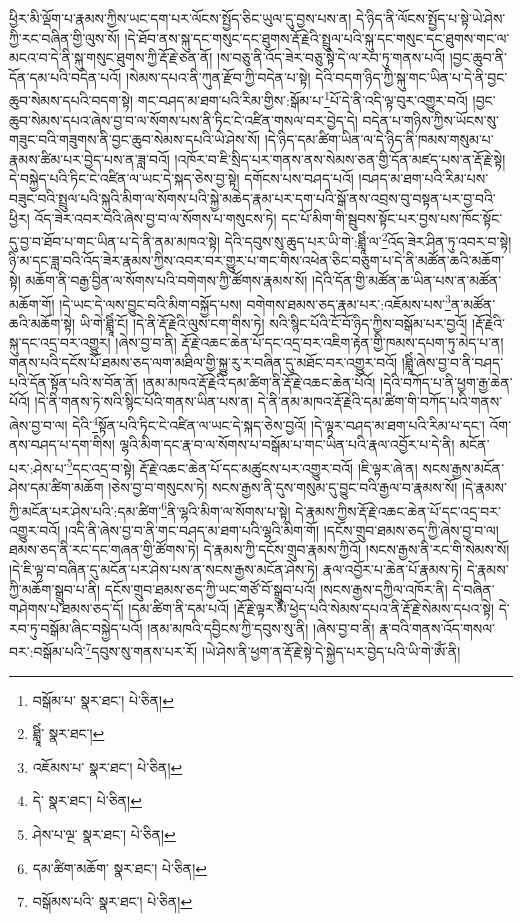 ཕྱིར་མི་ལྡོག་པ་རྣམས་ཀྱིས་ཡང་དག་པར་ལོངས་སྤྱོད་ཅིང་ཡུལ་དུ་བྱས་པས་ན། དེ་ཉིད་ནི་ལོངས་སྤྱོད་པ་སྟེ་ཡེ་ཤེས་ཀྱི་རང་བཞིན་གྱི་ལུས་སོ། །དེ་ཐོབ་ནས་སྐུ་དང་གསུང་དང་ཐུགས་རྡོ་རྗེའི་སྤྲུལ་པའི་སྐུ་དང་གསུང་དང་ཐུགས་གང་ལ་མངའ་བ་དེ་ནི་སྐུ་གསུང་ཐུགས་ཀྱི་རྡོ་རྗེ་ཅན་ནོ། །ས་བཅུ་ནི་འོད་ཟེར་བཅུ་སྟེ་དེ་ལ་རབ་ཏུ་གནས་པའོ། །བྱང་ཆུབ་ནི་དོན་དམ་པའི་བདེན་པའོ། །སེམས་དཔའ་ནི་ཀུན་རྫོབ་ཀྱི་བདེན་པ་སྟེ། དེའི་བདག་ཉིད་ཀྱི་སྐུ་གང་ཡིན་པ་དེ་ནི་བྱང་ཆུབ་སེམས་དཔའི་བདག་སྟེ། གང་བཤད་མ་ཐག་པའི་རིམ་གྱིས་:སྒོམ་པ་\footnote{བསྒོམ་པ་  སྣར་ཐང་།  པེ་ཅིན། }པོ་དེ་ནི་འདི་ལྟ་བུར་འགྱུར་བའོ། །བྱང་ཆུབ་སེམས་དཔའ་ཞེས་བྱ་བ་ལ་སོགས་པས་ནི་ཏིང་ངེ་འཛིན་གསལ་བར་བྱེད་དེ། བདེན་པ་གཉིས་ཀྱིས་ཡོངས་སུ་གཟུང་བའི་གཟུགས་ནི་བྱང་ཆུབ་སེམས་དཔའི་ཡེ་ཤེས་སོ། །དེ་ཉིད་དམ་ཚིག་ཡིན་ལ་དེ་ཉིད་ནི་ཁམས་གསུམ་པ་རྣམས་ཚིམ་པར་བྱེད་པས་ན་ཟླ་བའོ། །འཁོར་བ་ཇི་སྲིད་པར་གནས་ནས་སེམས་ཅན་གྱི་དོན་མཛད་པས་ན་རྡོ་རྗེ་སྟེ། དེ་བསྐྱེད་པའི་ཏིང་ངེ་འཛིན་ལ་ཡང་དེ་སྐད་ཅེས་བྱ་སྟེ། དགོངས་པས་བཤད་པའོ། །བཤད་མ་ཐག་པའི་རིམ་པས་བཟུང་བའི་སྤྲུལ་པའི་སྐུའི་མིག་ལ་སོགས་པའི་སྐྱེ་མཆེད་རྣམ་པར་དག་པའི་སྒོ་ནས་འབྲས་བུ་བསྟན་པར་བྱ་བའི་ཕྱིར། འོད་ཟེར་འབར་བའི་ཞེས་བྱ་བ་ལ་སོགས་པ་གསུངས་ཏེ། དང་པོ་མིག་གི་སྦུབས་སྟོང་པར་བྱས་པས་ཁོང་སྟོང་དུ་བྱ་བ་ཐོབ་པ་གང་ཡིན་པ་དེ་ནི་ནམ་མཁའ་སྟེ། དེའི་དབུས་སུ་ཆུད་པར་ཡི་གེ་:ཐླཱིཾ་ལ་\footnote{ཐླཱིཾ་  སྣར་ཐང་། }འོད་ཟེར་ཤིན་ཏུ་འབར་བ་སྟེ། ཉི་མ་དང་ཟླ་བའི་འོད་ཟེར་རྣམས་ཀྱིས་འབར་བར་གྱུར་པ་གང་གིས་འཕེན་ཅིང་བཅུག་པ་དེ་ནི་མཚོན་ཆའི་མཆོག་སྟེ། མཆོག་ནི་བརྒྱ་བྱིན་ལ་སོགས་པའི་བགེགས་ཀྱི་ཚོགས་རྣམས་སོ། །དེའི་དོན་གྱི་མཚོན་ཆ་ཡིན་པས་ན་མཚོན་མཆོག་གོ། །དེ་ཡང་དེ་ལས་བྱུང་བའི་མིག་བསྐྱོད་པས། བགེགས་ཐམས་ཅད་རྣམ་པར་:འཇོམས་པས་\footnote{འཇོམས་པ་  སྣར་ཐང་།  པེ་ཅིན། }ན་མཚོན་ཆའི་མཆོག་སྟེ། ཡི་གེ་ཐླཱིཾ་ངོ། །དེ་ནི་རྡོ་རྗེའི་ལུས་ངག་གིས་ཏེ། སའི་སྙིང་པོའི་ངོ་བོ་ཉིད་ཀྱིས་བསྒོམ་པར་བྱའོ། །རྡོ་རྗེའི་སྐུ་དང་འདྲ་བར་འགྱུར། །ཞེས་བྱ་བ་ནི། རྡོ་རྗེ་འཆང་ཆེན་པོ་དང་འདྲ་བར་འཇིག་རྟེན་གྱི་ཁམས་དཔག་ཏུ་མེད་པ་ན། གནས་པའི་དངོས་པོ་ཐམས་ཅད་ལག་མཐིལ་གྱི་སྐྱུ་རུ་ར་བཞིན་དུ་མཐོང་བར་འགྱུར་བའོ། །ཐླཱིཾ་ཞེས་བྱ་བ་ནི་བཤད་པའི་དོན་སྟོན་པའི་ས་བོན་ནོ། །ནམ་མཁའ་རྡོ་རྗེའི་དམ་ཚིག་ནི་རྡོ་རྗེ་འཆང་ཆེན་པོའོ། །དེའི་བཀོད་པ་ནི་ཕྱག་རྒྱ་ཆེན་པོའོ། །དེ་ནི་གནས་ཏེ་སའི་སྙིང་པོའི་གནས་ཡིན་པས་ན། དེ་ནི་ནམ་མཁའ་རྡོ་རྗེའི་དམ་ཚིག་གི་བཀོད་པའི་གནས་ཞེས་བྱ་བ་ལ། དེའི་\footnote{དེ་  སྣར་ཐང་།  པེ་ཅིན། }སྟོན་པའི་ཏིང་ངེ་འཛིན་ལ་ཡང་དེ་སྐད་ཅེས་བྱའོ། །དེ་ལྟར་བཤད་མ་ཐག་པའི་རིམ་པ་དང་། འོག་ནས་བཤད་པ་དག་གིས། ལྷའི་མིག་དང་རྣ་བ་ལ་སོགས་པ་བསྒོམ་པ་གང་ཡིན་པའི་རྣལ་འབྱོར་པ་དེ་ནི། མངོན་པར་:ཤེས་པ་\footnote{ཤེས་པ་ལྔ་  སྣར་ཐང་།  པེ་ཅིན། }དང་འདྲ་བ་སྟེ། རྡོ་རྗེ་འཆང་ཆེན་པོ་དང་མཚུངས་པར་འགྱུར་བའོ། །ཇི་ལྟར་ཞེ་ན། སངས་རྒྱས་མངོན་ཤེས་དམ་ཚིག་མཆོག །ཅེས་བྱ་བ་གསུངས་ཏེ། སངས་རྒྱས་ནི་དུས་གསུམ་དུ་བྱུང་བའི་རྒྱལ་བ་རྣམས་སོ། །དེ་རྣམས་ཀྱི་མངོན་པར་ཤེས་པའི་:དམ་ཚིག་\footnote{དམ་ཚིག་མཆོག་  སྣར་ཐང་།  པེ་ཅིན། }ནི་ལྷའི་མིག་ལ་སོགས་པ་སྟེ། དེ་རྣམས་ཀྱིས་རྡོ་རྗེ་འཆང་ཆེན་པོ་དང་འདྲ་བར་འགྱུར་བའོ། །འདི་ནི་ཞེས་བྱ་བ་ནི་གང་བཤད་མ་ཐག་པའི་ལྷའི་མིག་གོ། །དངོས་གྲུབ་ཐམས་ཅད་ཀྱི་ཞེས་བྱ་བ་ལ། ཐམས་ཅད་ནི་རང་དང་གཞན་གྱི་ཚོགས་ཏེ། དེ་རྣམས་ཀྱི་དངོས་གྲུབ་རྣམས་ཀྱིའོ། །སངས་རྒྱས་ནི་རང་གི་སེམས་སོ། །དེ་ཇི་ལྟ་བ་བཞིན་དུ་མངོན་པར་ཤེས་པས་ན་སངས་རྒྱས་མངོན་ཤེས་ཏེ། རྣལ་འབྱོར་པ་ཆེན་པོ་རྣམས་ཏེ། དེ་རྣམས་ཀྱི་མཆོག་སྒྲུབ་པ་ནི། དངོས་གྲུབ་ཐམས་ཅད་ཀྱི་ཡང་གཙོ་བོ་སྒྲུབ་པའོ། །སངས་རྒྱས་དཀྱིལ་འཁོར་ནི། དེ་བཞིན་གཤེགས་པ་ཐམས་ཅད་དོ། །དམ་ཚིག་ནི་དམ་པའོ། །རྡོ་རྗེ་ལྟར་མི་ཕྱེད་པའི་སེམས་དཔའ་ནི་རྡོ་རྗེ་སེམས་དཔའ་སྟེ། དེ་རབ་ཏུ་བསྒོམ་ཞིང་བསྐྱེད་པའོ། །ནམ་མཁའི་དབྱིངས་ཀྱི་དབུས་སུ་ནི། །ཞེས་བྱ་བ་ནི། རྣ་བའི་གནས་འོད་གསལ་བར་:བསྒོམ་པའི་\footnote{བསྒོམས་པའི་  སྣར་ཐང་།  པེ་ཅིན། }དབུས་སུ་གནས་པར་རོ། །ཡེ་ཤེས་ནི་ཕྱག་ན་རྡོ་རྗེ་སྟེ་དེ་སྐྱེད་པར་བྱེད་པའི་ཡི་གེ་ཨོཾ་ནི། 